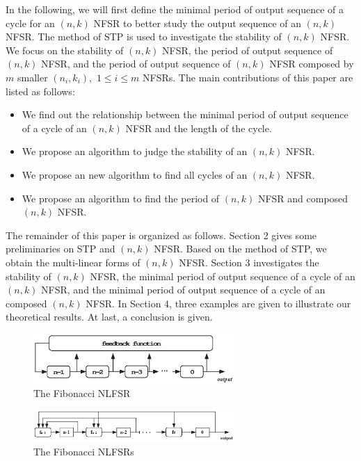 \documentclass[conference]{IEEEtran}
\begin{document}
In the following, we will first define the minimal period of output sequence of a cycle for an $(n,k)$ NFSR to better study the output sequence of an $(n,k)$ NFSR. The method of STP is used to investigate the stability of $(n,k)$ NFSR. We focus on the stability of $(n,k)$ NFSR, the period of output sequence of $(n,k)$ NFSR, and the period of output sequence of $(n,k)$ NFSR composed by $m$ smaller $(n_i,k_i),$ $1\leq i\leq m$ NFSRs. The main contributions of this paper are listed as follows:
\begin{itemize}
  \item We find out the relationship between the minimal period of output sequence of a cycle of an $(n,k)$ NFSR and the length of the cycle.
  \item We propose an algorithm to judge the stability of an $(n,k)$ NFSR.
  \item We propose an new algorithm to find all cycles of an $(n,k)$ NFSR.
  \item We propose an algorithm to find the period of $(n,k)$ NFSR and composed $(n,k)$ NFSR.
\end{itemize}

The remainder of this paper is organized as follows. Section 2 gives some preliminaries on STP and $(n,k)$ NFSR. Based on the method of STP, we obtain the multi-linear forms of $(n,k)$ NFSR. Section 3 investigates the stability of $(n,k)$ NFSR, the minimal period of output sequence of a cycle of an $(n,k)$ NFSR, and the minimal period of output sequence of a cycle of an composed $(n,k)$ NFSR. In Section 4, three examples are given to illustrate our theoretical results. At last, a conclusion is given.
\begin{figure}
\centering
\includegraphics[width=3in]{fsr.eps}
\caption{The Fibonacci NLFSR}
\label{fsr}
\end{figure}
\begin{figure}
\centering
\includegraphics[width=3in]{Galois.eps}
\caption{The Fibonacci NLFSRs}
\label{gsr}
\end{figure}
\end{document}
